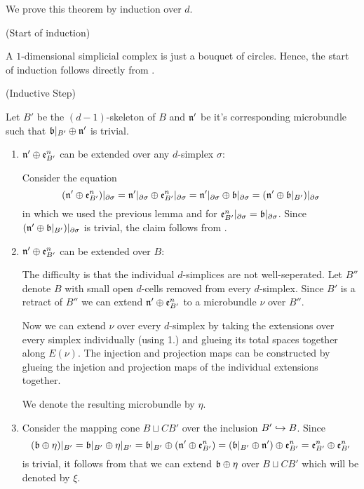 \begin{myproof}
    We prove this theorem by induction over $d$.

    (Start of induction)

    A $1$-dimensional simplicial complex is just a bouquet of circles.
    Hence, the start of induction follows directly from .   

    (Inductive Step)

    Let $B'$ be the $(d - 1)$-skeleton of $B$ and $\mathfrak{n}'$ be it's corresponding microbundle
    such that $\whitney{\bb[B']}{\bn'}$ is trivial.

    \begin{enumerate}
        \item $\mathfrak{n}' \oplus{} \mathfrak{e}^{n}_{B'}$ can be extended over any $d$-simplex $\sigma$:

        Consider the equation
        \[
            (\whitney{\bn'}{\be{B'}})\restr{\partial\sigma}
            = \whitney{\bn'\restr{\partial\sigma}}{\be{B'}\restr{\partial\sigma}}
            = \whitney{\bn'\restr{\partial\sigma}}{\bb[\partial\sigma]}
            = (\whitney{\bn'}{\bb[B']})\restr{\partial\sigma}
        \]
        in which we used the previous lemma and 
        for $\be{B'}\restr{\partial\sigma} = \bb[\partial\sigma]$.
        Since $(\whitney{\bn'}{\bb[B']})\restr{\partial\sigma}$ is trivial, the claim follows from .

        \item $\mathfrak{n}' \oplus{} \mathfrak{e}^{n}_{B'}$ can be extended over $B$:

        The difficulty is that the individual $d$-simplices are not well-seperated.
        Let $B''$ denote $B$ with small open $d$-cells removed from every $d$-simplex.
        Since $B'$ is a retract of $B''$ we can extend $\mathfrak{n}' \oplus{} \mathfrak{e}^{n}_{B'}$ to a microbundle $\nu$ over $B''$.

        Now we can extend $\nu$ over every $d$-simplex by taking the extensions
        over every simplex individually (using 1.) and glueing its total spaces together along $E(\nu)$.
        The injection and projection maps can be constructed
        by glueing the injetion and projection maps of the individual extensions together.

        We denote the resulting microbundle by $\eta$.

        \item
        Consider the mapping cone $B \sqcup CB'$ over the inclusion $B' \hookrightarrow{} B$.
        Since
        \[
            (\whitney{\bb}{\eta})\restr{B'}
            = \whitney{\bb[B']}{\eta\restr{B'}}
            = \whitney{\bb[B']}{(\whitney{\bn'}{\be{B'}})}
            = \whitney{(\whitney{\bb[B']}{\bn'})}{\be{B'}}
            = \whitney{\be{B'}}{\be{B'}}
        \]
        is trivial, it follows from  that we can extend $\whitney{\bb}{\eta}$ over $B \sqcup CB'$
        which will be denoted by $\xi$.


\end{enumerate}
\end{myproof}
